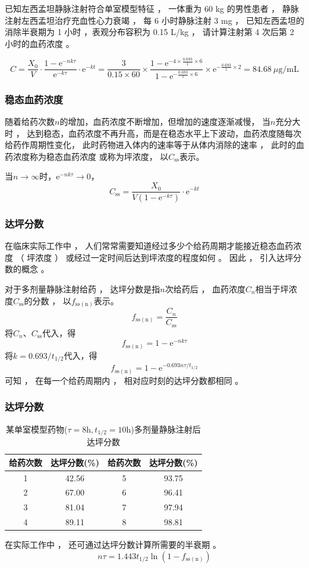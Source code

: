 \documentclass[dvipsnames, svgnames, x11names]{beamer}
\begin{document}
\begin{frame}[t]
	\frametitle{}
	\begin{example}
		已知左西孟坦静脉注射符合单室模型特征 ， 一体重为 60 kg 的男性患者 ， 静脉注射左西孟坦治疗充血性心力衰竭 ， 每 6 小时静脉注射 3 mg ， 已知左西孟坦的消除半衰期为 1 小时 ，表观分布容积为 0.15 L/kg ， 请计算注射第 4 次后第 2 小时的血药浓度 。
	\end{example}
	\pause
	\[
		C = \frac{X_0}{V}\cdot \frac{1-\mathrm{e}^{-nk\tau}}{\mathrm{e}^{-k\tau}}\cdot \mathrm{e}^{-kt} = \frac{3}{0.15\times 60}\times \frac{1-\mathrm{e}^{-4\times\frac{0.693}{1}\times 6}}{1-\mathrm{e}^{-\frac{0.693}{1}\times 6}}\times \mathrm{e}^{-\frac{0.693}{1}\times 2} = 84.68 \ \mu \mathrm{g/mL}
	\]
\end{frame}


\begin{frame}
	\frametitle{稳态血药浓度}
	随着给药次数$n$的增加，血药浓度不断增加，但增加的速度逐渐减慢， 当$n$充分大时 ， 达到稳态，血药浓度不再升高，而是在稳态水平上下波动，血药浓度随每次给药作周期性变化， 此时药物进入体内的速率等于从体内消除的速率 ， 此时的血药浓度称为稳态血药浓度 或称为坪浓度， 以$C_\mathrm{ss}$表示。

	当$n\to \infty$时，$\mathrm{e}^{-nk\tau} \to 0$，
	\[
		C_\mathrm{ss} = \frac{X_0}{V(1-\mathrm{e}^{-k\tau})}\cdot \mathrm{e}^{-kt}
	\]
\end{frame}


\begin{frame}
	\frametitle{达坪分数}
	在临床实际工作中 ， 人们常常需要知道经过多少个给药周期才能接近稳态血药浓度 （ 坪浓度 ） 或经过一定时间后达到坪浓度的程度如何 。 因此 ， 引入达坪分数的概念 。

	对于多剂量静脉注射给药 ， 达坪分数是指$n$次给药后 ， 血药浓度$C_n$相当于坪浓度$C_\mathrm{ss}$的分数 ， 以$f_\mathrm{ss(n)}$表示。
	\[
		f_\mathrm{ss(n)} = \frac{C_n}{C_\mathrm{ss}}
	\]
	将$C_n$、$C_\mathrm{ss}$代入，得
	\[
		f_\mathrm{ss(n)} = 1-\mathrm{e}^{-nk\tau}
	\]
	将$k=0.693/t_{1/2}$代入，得
	\[
		f_\mathrm{ss(n)} = 1-\mathrm{e}^{-0.693n\tau/t_{1/2}}
	\]
	可知 ， 在每一个给药周期内 ， 相对应时刻的达坪分数都相同 。
\end{frame}


\begin{frame}
	\frametitle{达坪分数}
	\begin{table}
        \centering
		\caption{某单室模型药物($\tau=8\mathrm{h},t_{1/2}=10\mathrm{h}$)多剂量静脉注射后达坪分数}
        \begin{tabular}{cc||cc}
            \bottomrule
            给药次数 & 达坪分数(\%)  & 给药次数 & 达坪分数(\%)  \\ \hline
            1 & 42.56 & 5 & 93.75 \\ 
            2 & 67.00 & 6 & 96.41 \\
            3 & 81.04 & 7 & 97.94 \\
            4 & 89.11 & 8 & 98.81 \\ \toprule
        \end{tabular}
    \end{table}

	在实际工作中 ， 还可通过达坪分数计算所需要的半衰期 。
	\[
		n\tau = 1.443 t_{1/2}\ln (1-f_\mathrm{ss(n)})
	\]
\end{frame}
\end{document}
